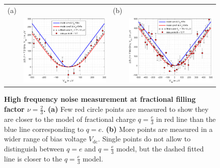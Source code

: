 \begin{figure}[hptb]
	\begin{center}
		\begin{tabular}{c c c c}
			(a) & & (b) & \\
			& \includegraphics[width = 6.5 cm]{./chap2/nu_2_3_RF_noise_vs_Vdc_at_7_2GHz} &
			& \includegraphics[width = 6.5 cm]{./chap2/nu_2_3_RF_noise_vs_Vdc_at_7_85GHz}
			
		\end{tabular}
	\end{center}
	
	\caption{\textbf{High frequency noise measurement at fractional filling factor $\nu = \frac{2}{3}$.} \textbf{(a)} Few red circle points are measured to show they are closer to the model of fractional charge $q = \frac{e}{3}$ in red line than the blue line corresponding to $q = e$. \textbf{(b)} More points are measured in a wider range of bias voltage $V_{\mathrm{dc}}$. Single points do not allow to distinguish between $q = e$ and $q = \frac{e}{3}$ model, but the dashed fitted line is closer to the $q = \frac{e}{3}$ model.}
	\label{fig: RF charac at 2/3}
\end{figure}

